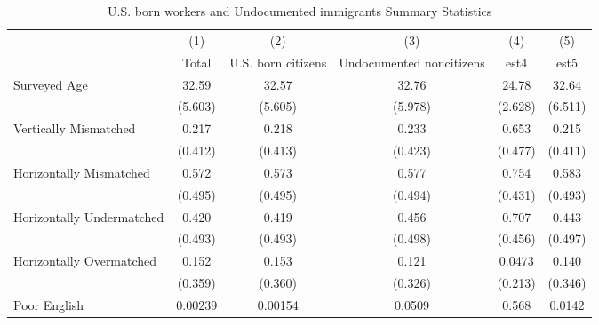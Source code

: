 \begin{table}[htbp]\centering
\def\sym#1{\ifmmode^{#1}\else\(^{#1}\)\fi}
\caption{U.S. born workers and Undocumented immigrants Summary Statistics \label{tab:sum}}
\begin{tabular}{l*{5}{c}}
\hline\hline
                    &\multicolumn{1}{c}{(1)}         &\multicolumn{1}{c}{(2)}         &\multicolumn{1}{c}{(3)}         &\multicolumn{1}{c}{(4)}         &\multicolumn{1}{c}{(5)}         \\
                    &       Total         &U.S. born citizens         &Undocumented noncitizens         &        est4         &        est5         \\
\hline
Surveyed Age        &       32.59         &       32.57         &       32.76         &       24.78         &       32.64         \\
                    &     (5.603)         &     (5.605)         &     (5.978)         &     (2.628)         &     (6.511)         \\
[1em]
Vertically Mismatched&       0.217         &       0.218         &       0.233         &       0.653         &       0.215         \\
                    &     (0.412)         &     (0.413)         &     (0.423)         &     (0.477)         &     (0.411)         \\
[1em]
Horizontally Mismatched&       0.572         &       0.573         &       0.577         &       0.754         &       0.583         \\
                    &     (0.495)         &     (0.495)         &     (0.494)         &     (0.431)         &     (0.493)         \\
[1em]
Horizontally Undermatched&       0.420         &       0.419         &       0.456         &       0.707         &       0.443         \\
                    &     (0.493)         &     (0.493)         &     (0.498)         &     (0.456)         &     (0.497)         \\
[1em]
Horizontally Overmatched&       0.152         &       0.153         &       0.121         &      0.0473         &       0.140         \\
                    &     (0.359)         &     (0.360)         &     (0.326)         &     (0.213)         &     (0.346)         \\
[1em]
Poor English        &     0.00239         &     0.00154         &      0.0509         &       0.568         &      0.0142         \\

\end{tabular}
\end{table}
